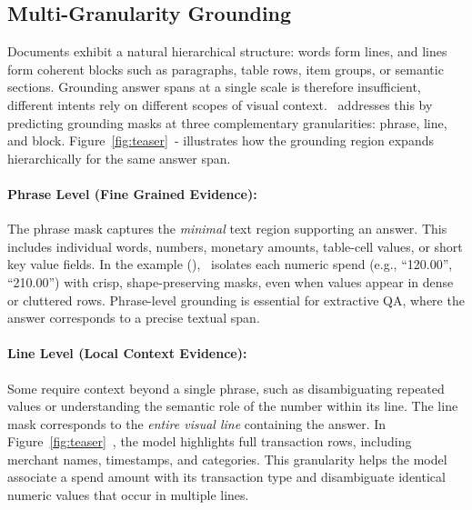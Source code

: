 

\subsection{Multi-Granularity Grounding}

Documents exhibit a natural hierarchical structure: words form lines, and lines form coherent blocks such as paragraphs, table rows, item groups, or semantic sections. 
Grounding answer spans at a single scale is therefore insufficient, different intents rely on different scopes of visual context. 
\modelName\ addresses this by predicting grounding masks at three complementary granularities: phrase, line, and block. 
Figure~\ref{fig:teaser}~- illustrates how the grounding region expands hierarchically for the same answer span.

\paragraph{Phrase Level (Fine Grained Evidence):}
The phrase mask captures the \emph{minimal} text region supporting an answer. 
This includes individual words, numbers, monetary amounts, table-cell values, or short key value fields. 
In the example (), \modelName\ isolates each numeric spend (e.g., ``120.00'', ``210.00'') with crisp, shape-preserving masks, even when values appear in dense or cluttered rows. 
Phrase-level grounding is essential for extractive QA, where the answer corresponds to a precise textual span.

\paragraph{Line Level (Local Context Evidence):}
Some require context beyond a single phrase, such as disambiguating repeated values or understanding the semantic role of the number within its line. 
The line mask corresponds to the \emph{entire visual line} containing the answer.
In Figure~\ref{fig:teaser}~, the model highlights full transaction rows, including merchant names, timestamps, and categories. 
This granularity helps the model associate a spend amount with its transaction type and disambiguate identical numeric values that occur in multiple lines.

